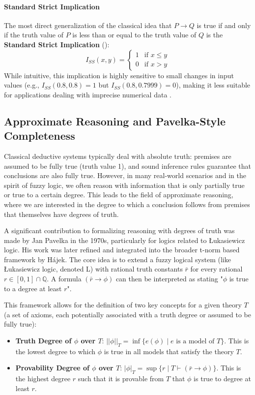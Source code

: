\paragraph{Standard Strict Implication}
The most direct generalization of the classical idea that $P \rightarrow Q$ is true if and only if the truth value of $P$ is less than or equal to the truth value of $Q$ is the \textbf{Standard Strict Implication} (\cite[p.58]{FULLER2}):
\[I_{SS}(x,y) = \begin{cases} 1 & \text{if } x \le y \\ 0 & \text{if } x > y \end{cases}\]
While intuitive, this implication is highly sensitive to small changes in input values (e.g., $I_{SS}(0.8, 0.8)=1$ but $I_{SS}(0.8, 0.7999)=0$), making it less suitable for applications dealing with imprecise numerical data \cite[p.58]{FULLER2}.

\subsection{Approximate Reasoning and Pavelka-Style Completeness}

Classical deductive systems typically deal with absolute truth: premises are assumed to be fully true (truth value 1), and sound inference rules guarantee that conclusions are also fully true. However, in many real-world scenarios and in the spirit of fuzzy logic, we often reason with information that is only partially true or true to a certain degree. This leads to the field of approximate reasoning, where we are interested in the degree to which a conclusion follows from premises that themselves have degrees of truth.

A significant contribution to formalizing reasoning with degrees of truth was made by Jan Pavelka in the 1970s, particularly for logics related to Łukasiewicz logic. His work was later refined and integrated into the broader t-norm based framework by Hájek. The core idea is to extend a fuzzy logical system (like Łukasiewicz logic, denoted L) with rational truth constants $\bar{r}$ for every rational $r \in [0,1] \cap \mathbb{Q}$. A formula $(\bar{r} \rightarrow \phi)$ can then be interpreted as stating "$\phi$ is true to a degree at least $r$".

This framework allows for the definition of two key concepts for a given theory $T$ (a set of axioms, each potentially associated with a truth degree or assumed to be fully true):

\begin{itemize}
    \item \textbf{Truth Degree of $\phi$ over $T$}: $||\phi||_T = \inf\{e(\phi) \mid e \text{ is a model of } T\}$. This is the lowest degree to which $\phi$ is true in all models that satisfy the theory $T$.
    \item \textbf{Provability Degree of $\phi$ over $T$}: $|\phi|_T = \sup\{r \mid T \vdash (\bar{r} \rightarrow \phi)\}$. This is the highest degree $r$ such that it is provable from $T$ that $\phi$ is true to degree at least $r$.
\end{itemize}

